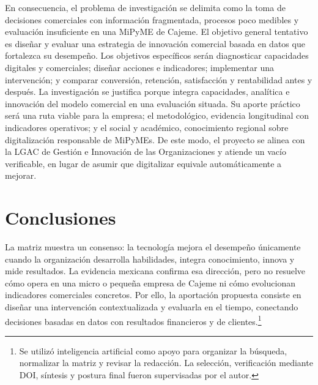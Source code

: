 \documentclass[spanish,letterpaper,oneside]{article}
\begin{document}
En consecuencia, el problema de investigación se delimita como la toma de decisiones comerciales con información fragmentada, procesos poco medibles y evaluación insuficiente en una MiPyME de Cajeme. El objetivo general tentativo es diseñar y evaluar una estrategia de innovación comercial basada en datos que fortalezca su desempeño. Los objetivos específicos serán diagnosticar capacidades digitales y comerciales; diseñar acciones e indicadores; implementar una intervención; y comparar conversión, retención, satisfacción y rentabilidad antes y después. La investigación se justifica porque integra capacidades, analítica e innovación del modelo comercial en una evaluación situada. Su aporte práctico será una ruta viable para la empresa; el metodológico, evidencia longitudinal con indicadores operativos; y el social y académico, conocimiento regional sobre digitalización responsable de MiPyMEs. De este modo, el proyecto se alinea con la LGAC de Gestión e Innovación de las Organizaciones y atiende un vacío verificable, en lugar de asumir que digitalizar equivale automáticamente a mejorar.

\section{Conclusiones}

La matriz muestra un consenso: la tecnología mejora el desempeño únicamente cuando la organización desarrolla habilidades, integra conocimiento, innova y mide resultados. La evidencia mexicana confirma esa dirección, pero no resuelve cómo opera en una micro o pequeña empresa de Cajeme ni cómo evolucionan indicadores comerciales concretos. Por ello, la aportación propuesta consiste en diseñar una intervención contextualizada y evaluarla en el tiempo, conectando decisiones basadas en datos con resultados financieros y de clientes.\footnote{Se utilizó inteligencia artificial como apoyo para organizar la búsqueda, normalizar la matriz y revisar la redacción. La selección, verificación mediante DOI, síntesis y postura final fueron supervisadas por el autor.}

\clearpage
\end{document}
